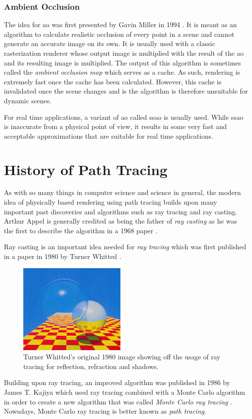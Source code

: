 \documentclass[
  twoside,
  11pt, a4paper,
  footinclude=true,
  headinclude=true,
  cleardoublepage=empty
]{scrreprt}
\begin{document}
\subsubsection{Ambient Occlusion}
The idea for \ac{ao} was first presented by Gavin Miller in 1994
\cite{inproceedings:ambient-occlusion}. It is meant as an algorithm to calculate realistic
occlusion of every point in a scene and cannot generate an accurate image on its own. It is
usually used with a classic rasterization renderer whose output image is multiplied with the result
of the \ac{ao} and its resulting image is multiplied. The output of this algorithm is sometimes
called the \emph{ambient occlusion map} which serves as a cache. As such, rendering is extremely
fast once the cache has been calculated. However, this cache is invalidated once the scene changes
and is the algorithm is therefore unsuitable for dynamic scenes.

For real time applications, a variant of \ac{ao} called \acf{ssao} is usually used. While \ac{ssao}
is inaccurate from a physical point of view, it results in some very fast and acceptable
approximations that are suitable for real time applications.

\section{History of Path Tracing}
As with so many things in computer science and science in general, the modern idea of physically
based rendering using path tracing builds upon many important past discoveries and algorithms
such as ray tracing and ray casting.
Arthur Appel is generally credited as being the father of
\emph{ray casting} as he was the first to describe the algorithm in a 1968 paper
\cite{inproceedings:raycasting}.

Ray casting is an important idea needed for \emph{ray tracing} which was
first published in a paper in 1980 by Turner Whitted \cite{article:raytracing}.

\begin{figure}[H]
    \includegraphics{early-raytracing-whitted}
    \centering
    \caption{Turner Whitted's original 1980 \cite{article:raytracing} image showing off the usage of ray tracing for
    reflection, refraction and shadows.}
    \label{fig:early-raytracing-whitted}
\end{figure}
Building upon ray tracing, an improved algorithm was published in 1986 by James T. Kajiya which used ray tracing
combined with a Monte Carlo algorithm in order to create a new algorithm that was called \emph{Monte
Carlo ray tracing} \cite{inproceedings:pathtracing}. Nowadays, Monte Carlo ray tracing is better
known as \emph{path tracing}.
\end{document}
